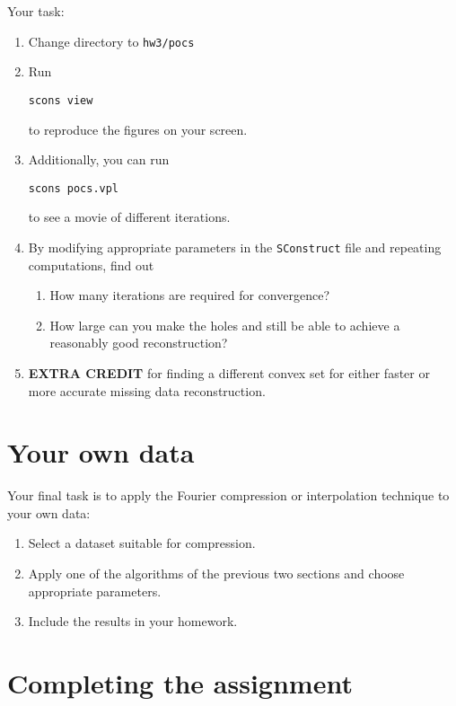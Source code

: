 Your task:
\begin{enumerate}
\item Change directory to \texttt{hw3/pocs}
\item Run 
\begin{verbatim}
scons view
\end{verbatim}
to reproduce the figures on your screen.
\item Additionally, you can run
\begin{verbatim}
scons pocs.vpl
\end{verbatim}
to see a movie of different iterations.
\item By modifying appropriate parameters in the \texttt{SConstruct} file and repeating computations,
find out
\begin{enumerate}
\item How many iterations are required for convergence?
\item How large can you make the holes and still be able to achieve a reasonably good reconstruction?
\end{enumerate}
\item \textbf{EXTRA CREDIT} for finding a different convex set for either faster or more accurate missing data reconstruction.
\end{enumerate}


\section{Your own data}

Your final task is to apply the Fourier compression or interpolation technique
to your own data:
\begin{enumerate}
\item Select a dataset suitable for compression. 
\item Apply one of the algorithms of the previous two sections and choose appropriate parameters.
\item Include the results in your homework.
\end{enumerate}

\section{Completing the assignment}


